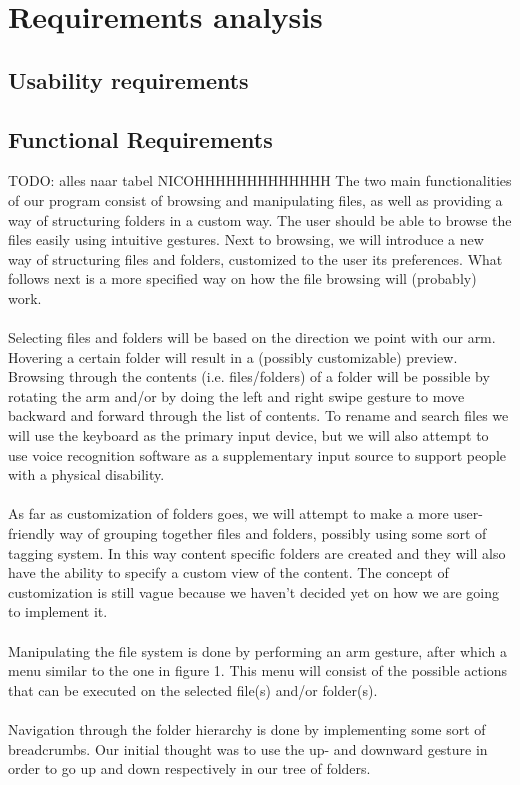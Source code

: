 \documentclass{article}
\begin{document}
\section{Requirements analysis}

\subsection{Usability requirements}

\subsection{Functional Requirements}
TODO: alles naar tabel NICOHHHHHHHHHHHHH
The two main functionalities of our program consist of browsing and manipulating files, as well as providing a way of structuring folders in a custom way. The user should be able to browse the files easily using intuitive gestures. Next to browsing, we will introduce a new way of structuring files and folders, customized to the user its preferences. What follows next is a more specified way on how the file browsing will (probably) work. 
\\\\
Selecting files and folders will be based on the direction we point with our arm. Hovering a certain folder will result in a (possibly customizable) preview. Browsing through the contents (i.e. files/folders) of a folder will be possible by rotating the arm and/or by doing the left and right swipe gesture to move backward and forward through the list of contents. To rename and search files we will use the keyboard as the primary input device, but we will also attempt to use voice recognition software as a supplementary input source to support people with a physical disability.
\\\\
As far as customization of folders goes, we will attempt to make a more user-friendly way of grouping together files and folders, possibly using some sort of tagging system. In this way content specific folders are created and they will also have the ability to specify a custom view of the content. The concept of customization is still vague because we haven't decided yet on how we are going to implement it.
\\\\
Manipulating the file system is done by performing an arm gesture, after which a menu similar to the one in figure 1. This menu will consist of the possible actions that can be executed on the selected file(s) and/or folder(s).
\\\\
Navigation through the folder hierarchy is done by implementing some sort of breadcrumbs. Our initial thought was to use the  up- and downward gesture in order to go up and down respectively in our tree of folders.
\end{document}
